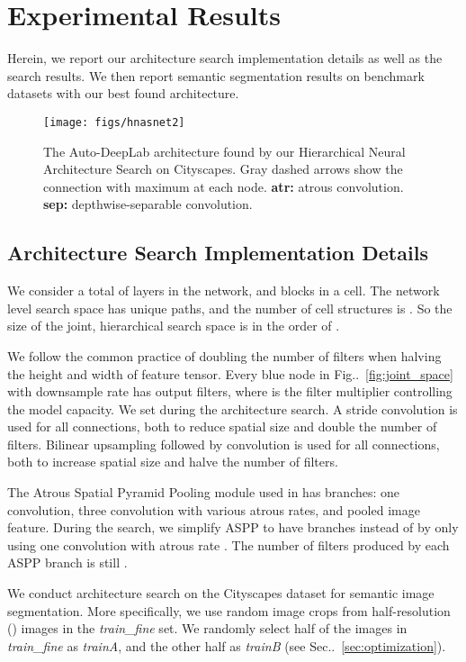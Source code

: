 \documentclass[10pt,twocolumn,letterpaper]{article}
\makeatletter
\def\@onedot{\ifx\@let@token.\else.\null\fi\xspace}
\DeclareRobustCommand\onedot{\futurelet\@let@token\@onedot}
\newcommand{\figref}[1]{Fig\onedot~\ref{#1}}
\newcommand{\secref}[1]{Sec\onedot~\ref{#1}}
\makeatother
\begin{document}
 \section{Experimental Results}
\label{sec:experiments}
Herein, we report our architecture search implementation details as well as the search results. We then report semantic segmentation results on benchmark datasets with our best found architecture.

\begin{figure*}[t]
    \centering
    \texttt{[image: figs/hnasnet2]}
    \caption{The Auto-DeepLab architecture found by our Hierarchical Neural Architecture Search on Cityscapes. Gray dashed arrows show the connection with maximum  at each node. {\bf atr:} atrous convolution. {\bf sep:} depthwise-separable convolution.}
    \label{fig:hnasnet}
\end{figure*}


\subsection{Architecture Search Implementation Details}
\label{sec:search_implementation}

We consider a total of  layers in the network, and  blocks in a cell.
The network level search space has  unique paths, and the number of cell structures is .
So the size of the joint, hierarchical search space is in the order of .

We follow the common practice of doubling the number of filters when halving the height and width of feature tensor. Every blue node in \figref{fig:joint_space} with downsample rate  has  output filters, where  is the filter multiplier controlling the model capacity.
We set  during the architecture search.
A stride  convolution is used for all  connections, both to reduce spatial size and double the number of filters.
Bilinear upsampling followed by  convolution is used for all  connections, both to increase spatial size and halve the number of filters.

The Atrous Spatial Pyramid Pooling module used in \cite{chen2017rethinking} has  branches: one  convolution, three  convolution with various atrous rates, and pooled image feature.
During the search, we simplify ASPP to have  branches instead of  by only using one  convolution with atrous rate . 
The number of filters produced by each ASPP branch is still .

We conduct architecture search on the Cityscapes dataset \cite{Cordts2016Cityscapes} for semantic image segmentation. 
More specifically, we use  random image crops from half-resolution () images in the \textit{train\_fine} set.
We randomly select half of the images in \textit{train\_fine} as \textit{trainA}, and the other half as \textit{trainB} (see \secref{sec:optimization}).
\end{document}
